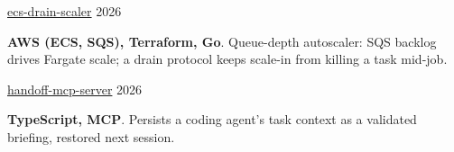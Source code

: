 
\newcommand{\projectlink}[2]{{\fontsize{9.5pt}{1em}\bodyfont\upshape\color{awesome}\href{#1}{#2}}}

\begin{cventries}

  \cventry
    {\projectlink{https://github.com/Abdelwahab313/ecs-drain-scaler}{ecs-drain-scaler}}
    {}
    {}
    {2026}
    {
      \begin{cvitems}
        \item {\textbf{AWS (ECS, SQS), Terraform, Go}. Queue-depth autoscaler: SQS backlog drives Fargate scale; a drain protocol keeps scale-in from killing a task mid-job.}
      \end{cvitems}
    }

  \cventry
    {\projectlink{https://github.com/Abdelwahab313/handoff-mcp-server}{handoff-mcp-server}}
    {}
    {}
    {2026}
    {
      \begin{cvitems}
        \item {\textbf{TypeScript, MCP}. Persists a coding agent's task context as a validated briefing, restored next session.}
      \end{cvitems}
    }

\end{cventries}
